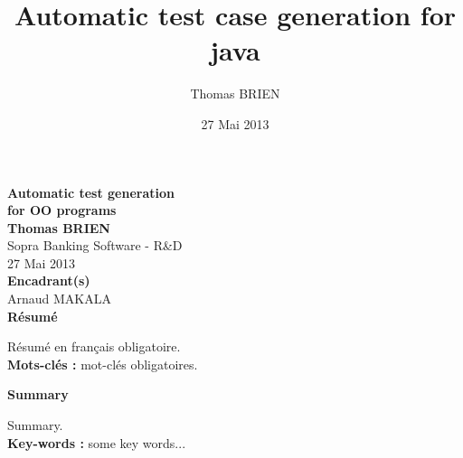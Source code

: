 \documentclass[a4paper]{report}
\title{Automatic test case generation for java}
\author{Thomas BRIEN}
\date{27 Mai 2013}
\begin{document}

\def\TitreRapport{
    Automatic test generation\\
    for OO programs
}

\def\NomsAuteurs{
    Thomas BRIEN
}

\def\DateRapport{
    27 Mai 2013
}

\def\Encadrants{
    \textbf{Encadrant(s)} \\
    Arnaud MAKALA
}
\def\Labo{
    Sopra Banking Software - R\&D
}



\def\ResumeFrancais{
    R\'esum\'e en fran\c{c}ais obligatoire.
    \\[2mm]
    {\bf Mots-cl\'es : } mot-cl\'es  obligatoires.
}

\def\Resume{
    Summary.
    \\[2mm]
    {\bf Key-words : } some key words...
}


\thispagestyle{empty}
\begin{center}
\normalbaselineskip
{\bf\Large \TitreRapport}\\[8mm]
{\bf\large \NomsAuteurs}\\[1mm]
{\Labo}\\[4mm]
\DateRapport\\[4mm]
\Encadrants\\[10mm]

\newpage
{\bf R\'esum\'e}
\end{center}


\ResumeFrancais\\[4mm]
\newline
\begin{center}
{\bf Summary}
\end{center}
\Resume\\[4mm]

\newpage


\tableofcontents

\renewcommand{\thesection}{\arabic{section}}

\newtheorem{theorem}{Theorem}
\newtheorem{lemma}{Lemme}

\renewcommand{\thetheorem}{\empty{}}
\renewcommand{\thelemma}{\empty{}} 
\end{document}
